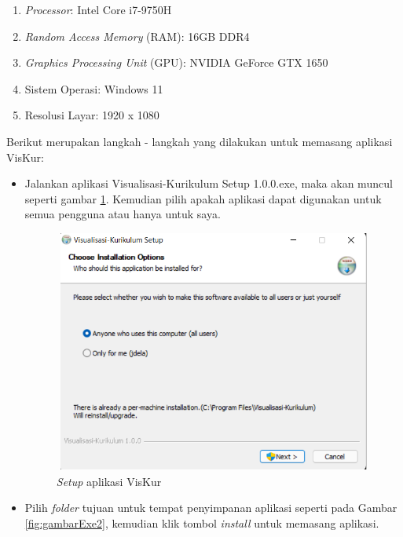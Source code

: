 \begin{enumerate}
    \item \textit{Processor}: Intel Core i7-9750H
    \item \textit{Random Access Memory} (RAM): 16GB DDR4
    \item \textit{Graphics Processing Unit} (GPU): NVIDIA GeForce GTX 1650
    \item Sistem Operasi: Windows 11 
    \item Resolusi Layar: 1920 x 1080
\end{enumerate}

\vspace{3mm}
Berikut merupakan langkah - langkah yang dilakukan untuk memasang aplikasi VisKur:
\vspace{4mm}
\begin{itemize}
    \item Jalankan aplikasi Visualisasi-Kurikulum Setup 1.0.0.exe, maka akan muncul seperti gambar \ref{fig:gambarExe1}. Kemudian pilih apakah aplikasi dapat digunakan untuk semua pengguna atau hanya untuk saya.
    
    \begin{figure}[H]
        \centering
        \includegraphics[width=11cm, height=8cm]{Gambar/exe1.png}
        \caption{\textit{Setup }aplikasi VisKur}
        \label{fig:gambarExe1}
    \end{figure}
    
    \item Pilih \textit{folder} tujuan untuk tempat penyimpanan aplikasi seperti pada Gambar \ref{fig:gambarExe2}, kemudian klik tombol \textit{install} untuk memasang aplikasi.
    

\end{itemize}
